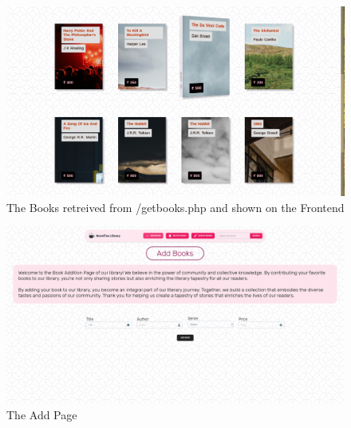 \documentclass[11pt]{article}
\begin{document}
\begin{figure}[H]
    \centering
    \includegraphics[width=.95\textwidth]{screenshots/books.png}
    \caption{The Books retreived from /getbooks.php and shown on the Frontend}
\end{figure}

\begin{figure}[H]
    \centering
    \includegraphics[width=.95\textwidth]{screenshots/add.png}
    \caption{The Add Page}
\end{figure}
\end{document}
